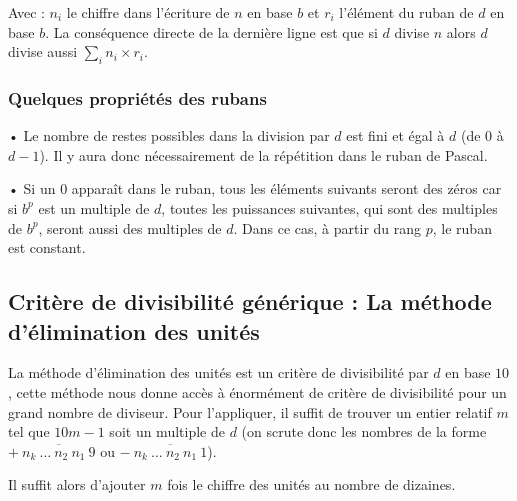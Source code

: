 \documentclass[a4paper]{article}
\begin{document}
\vspace{2 mm}

	Avec : $n_i$ le chiffre dans l'écriture de $n$ en base $b$ et $r_i$ l'élément du ruban de $d$ en base $b$.
La conséquence directe de la dernière ligne est que si $d$ divise $n$ alors $d$ divise aussi $\sum\limits_i n_i \times r_i$.\\

\vfill



\subsubsection*{Quelques propriétés des rubans}\label{ruban_proprietes}

    • Le nombre de restes possibles dans la division par $d$ est fini et égal à $d$ (de $0$ à $d - 1$). Il y aura donc nécessairement de la répétition dans le ruban de Pascal.


    • Si un $0$ apparaît dans le ruban, tous les éléments suivants seront des zéros car si $b^p$ est un multiple de $d$, toutes les puissances suivantes, qui sont des multiples de $b^p$, seront aussi des multiples de $d$. Dans ce cas, à partir du rang $p$, le ruban est constant.\\

\vfill

\pagebreak















\subsection{Critère de divisibilité générique : La méthode d'élimination des unités}\label{recherche_critere}

	La méthode d'élimination des unités est un critère de divisibilité par $d$ en base $10$, cette méthode nous donne accès à énormément de critère de divisibilité pour un grand nombre de diviseur. Pour l'appliquer, il suffit de trouver un entier relatif $m$ tel que $10m - 1$ soit un multiple de $d$ (on scrute donc les nombres de la forme $+~\overline{n_{k}~\dots~n_{2}~n_{1}~9}$ ou $-~\overline{n_{k}~\dots~n_{2}~n_{1}~1}$).
	
	Il suffit alors d'ajouter $m$ fois le chiffre des unités au nombre de dizaines.\\
	
\end{document}
